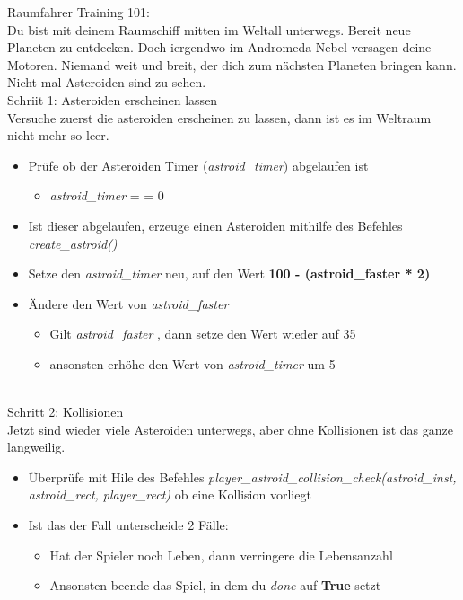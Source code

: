 \large Raumfahrer Training 101:\\
Du bist mit deinem Raumschiff mitten im Weltall unterwegs. Bereit neue Planeten zu entdecken. Doch iergendwo im Andromeda-Nebel versagen deine Motoren. Niemand weit und breit, der dich zum nächsten Planeten bringen kann. Nicht mal Asteroiden sind zu sehen.\\
\large Schriit 1: Asteroiden erscheinen lassen\\
Versuche zuerst die asteroiden erscheinen zu lassen, dann ist es im Weltraum nicht mehr so leer.
\begin{itemize}
	\item Prüfe ob der Asteroiden Timer (\textit{astroid\_timer}) abgelaufen ist
	\begin{itemize}
		\item \textit{astroid\_timer} = = 0
	\end{itemize}
	\item Ist dieser abgelaufen, erzeuge einen Asteroiden mithilfe des Befehles \textit{create\_astroid()}
	\item Setze den \textit{astroid\_timer} neu, auf den Wert \textbf{100 - (astroid_faster * 2)}
	\item Ändere den Wert von \textit{astroid\_faster}
	\begin{itemize}
		\item Gilt \textit{astroid\_faster} , dann setze den Wert wieder auf 35
		\item ansonsten erhöhe den Wert von \textit{astroid\_timer} um 5
	\end{itemize}
\end{itemize} 
\\
\lage Schritt 2: Kollisionen\\
Jetzt sind wieder viele Asteroiden unterwegs, aber ohne Kollisionen ist das ganze langweilig.
\begin{itemize}
	\item Überprüfe mit Hile des Befehles \textit{player\_astroid\_collision\_check(astroid\_inst, astroid\_rect, player\_rect)} ob eine Kollision vorliegt
	\item Ist das der Fall unterscheide 2 Fälle:
	\begin{itemize}
		\item Hat der Spieler noch Leben, dann verringere die Lebensanzahl
		\item Ansonsten beende das Spiel, in dem du \textit{done} auf \textbf{True} setzt
	\end{itemize}
\end{itemize}
